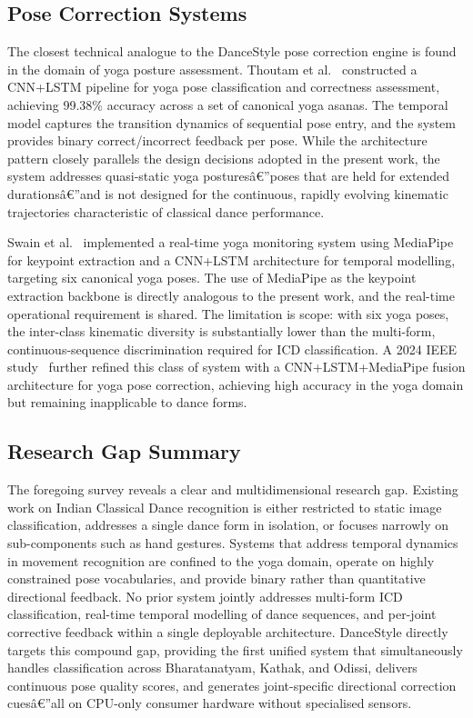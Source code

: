\documentclass[journal]{IEEEtran}
\begin{document}
\subsection{Pose Correction Systems}

The closest technical analogue to the DanceStyle pose correction engine
is found in the domain of yoga posture assessment. Thoutam et
al.~\cite{thoutam2022} constructed a CNN+LSTM pipeline for yoga pose
classification and correctness assessment, achieving 99.38\% accuracy
across a set of canonical yoga asanas. The temporal model captures the
transition dynamics of sequential pose entry, and the system provides
binary correct/incorrect feedback per pose. While the architecture
pattern closely parallels the design decisions adopted in the present
work, the system addresses quasi-static yoga posturesâ€”poses that are
held for extended durationsâ€”and is not designed for the continuous,
rapidly evolving kinematic trajectories characteristic of classical
dance performance.

Swain et al.~\cite{swain2022} implemented a real-time yoga monitoring
system using MediaPipe for keypoint extraction and a CNN+LSTM
architecture for temporal modelling, targeting six canonical yoga
poses. The use of MediaPipe as the keypoint extraction backbone is
directly analogous to the present work, and the real-time operational
requirement is shared. The limitation is scope: with six yoga poses,
the inter-class kinematic diversity is substantially lower than the
multi-form, continuous-sequence discrimination required for ICD
classification. A 2024 IEEE study~\cite{yogavision2024} further
refined this class of system with a CNN+LSTM+MediaPipe fusion
architecture for yoga pose correction, achieving high accuracy in
the yoga domain but remaining inapplicable to dance forms.

\subsection{Research Gap Summary}

The foregoing survey reveals a clear and multidimensional research gap.
Existing work on Indian Classical Dance recognition is either restricted
to static image classification, addresses a single dance form in
isolation, or focuses narrowly on sub-components such as hand gestures.
Systems that address temporal dynamics in movement recognition are
confined to the yoga domain, operate on highly constrained pose
vocabularies, and provide binary rather than quantitative directional
feedback. No prior system jointly addresses multi-form ICD
classification, real-time temporal modelling of dance sequences, and
per-joint corrective feedback within a single deployable architecture.
DanceStyle directly targets this compound gap, providing the first unified
system that simultaneously handles classification across Bharatanatyam,
Kathak, and Odissi, delivers continuous pose quality scores, and
generates joint-specific directional correction cuesâ€”all on
CPU-only consumer hardware without specialised sensors.
\end{document}
